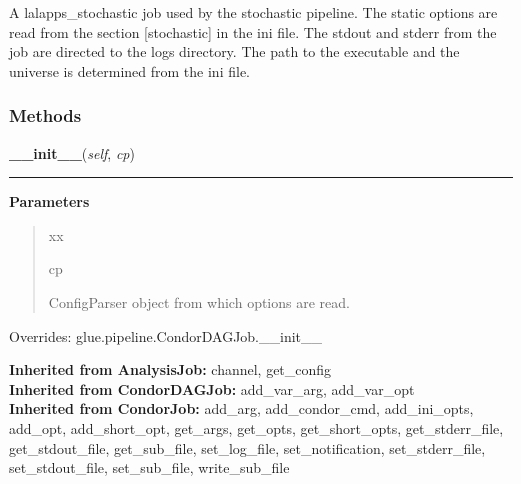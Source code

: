 A lalapps\_stochastic job used by the stochastic pipeline. The static 
options are read from the section [stochastic] in the ini file. The 
stdout and stderr from the job are directed to the logs directory. The 
path to the executable and the universe is determined from the ini file.



  \subsubsection{Methods}

    \label{stochastic:StochasticJob:__init__}
    \vspace{0.5ex}

    \begin{boxedminipage}{\textwidth}

    \raggedright \textbf{\_\_init\_\_}(\textit{self}, \textit{cp})

    \vspace{-1.5ex}

    \rule{\textwidth}{0.5\fboxrule}
    \vspace{1ex}

      \textbf{Parameters}
      \begin{quote}
        \begin{Ventry}{xx}

          \item[cp]

          ConfigParser object from which options are read.

        \end{Ventry}

      \end{quote}

    \vspace{1ex}

      Overrides: glue.pipeline.CondorDAGJob.\_\_init\_\_

    \end{boxedminipage}

  \textbf{Inherited from AnalysisJob:}
    channel,
    get\_config
    \\
  \textbf{Inherited from CondorDAGJob:}
    add\_var\_arg,
    add\_var\_opt
    \\
  \textbf{Inherited from CondorJob:}
    add\_arg,
    add\_condor\_cmd,
    add\_ini\_opts,
    add\_opt,
    add\_short\_opt,
    get\_args,
    get\_opts,
    get\_short\_opts,
    get\_stderr\_file,
    get\_stdout\_file,
    get\_sub\_file,
    set\_log\_file,
    set\_notification,
    set\_stderr\_file,
    set\_stdout\_file,
    set\_sub\_file,
    write\_sub\_file

